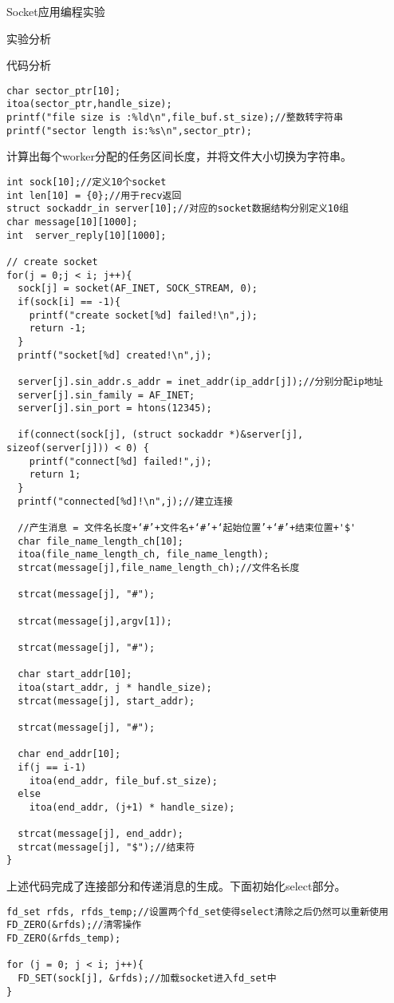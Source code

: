 \documentclass{article} %
\begin{document}
\begin{section}{Socket应用编程实验}
\begin{subsection}{实验分析}
\begin{subsubsection}{代码分析}
\begin{lstlisting}[language={[ANSI]C}]
char sector_ptr[10];
itoa(sector_ptr,handle_size);
printf("file size is :%ld\n",file_buf.st_size);//整数转字符串
printf("sector length is:%s\n",sector_ptr);
				\end{lstlisting}
				计算出每个worker分配的任务区间长度，并将文件大小切换为字符串。
				\begin{lstlisting}[language={[ANSI]C}]
int sock[10];//定义10个socket
int len[10] = {0};//用于recv返回
struct sockaddr_in server[10];//对应的socket数据结构分别定义10组
char message[10][1000];
int  server_reply[10][1000];

// create socket
for(j = 0;j < i; j++){
  sock[j] = socket(AF_INET, SOCK_STREAM, 0);
  if(sock[i] == -1){
	printf("create socket[%d] failed!\n",j);
	return -1;
  }
  printf("socket[%d] created!\n",j);

  server[j].sin_addr.s_addr = inet_addr(ip_addr[j]);//分别分配ip地址
  server[j].sin_family = AF_INET;
  server[j].sin_port = htons(12345);

  if(connect(sock[j], (struct sockaddr *)&server[j], sizeof(server[j])) < 0) {
    printf("connect[%d] failed!",j);
    return 1;
  }
  printf("connected[%d]!\n",j);//建立连接

  //产生消息 = 文件名长度+‘#’+文件名+‘#’+‘起始位置’+‘#’+结束位置+'$'
  char file_name_length_ch[10];
  itoa(file_name_length_ch, file_name_length);
  strcat(message[j],file_name_length_ch);//文件名长度

  strcat(message[j], "#");

  strcat(message[j],argv[1]);

  strcat(message[j], "#");

  char start_addr[10];
  itoa(start_addr, j * handle_size);
  strcat(message[j], start_addr);

  strcat(message[j], "#");

  char end_addr[10];
  if(j == i-1)
    itoa(end_addr, file_buf.st_size);
  else
    itoa(end_addr, (j+1) * handle_size);

  strcat(message[j], end_addr);
  strcat(message[j], "$");//结束符
}
				\end{lstlisting}
				上述代码完成了连接部分和传递消息的生成。下面初始化select部分。
				\begin{lstlisting}[language={[ANSI]C}]
fd_set rfds, rfds_temp;//设置两个fd_set使得select清除之后仍然可以重新使用
FD_ZERO(&rfds);//清零操作
FD_ZERO(&rfds_temp);

for (j = 0; j < i; j++){
  FD_SET(sock[j], &rfds);//加载socket进入fd_set中
}


\end{lstlisting}
\end{subsubsection}
\end{subsection}
\end{section}
\end{document}
